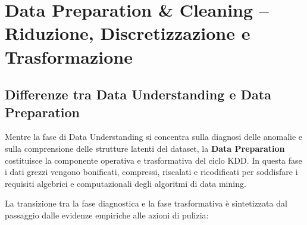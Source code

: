 \chapter{Data Preparation \& Cleaning -- Riduzione, Discretizzazione e Trasformazione}
\label{chap:dm-data-preparation-cleaning}

\FloatBarrier
\section{Differenze tra Data Understanding e Data Preparation}
\label{sec:dm-du-vs-dp}

Mentre la fase di Data Understanding si concentra sulla diagnosi delle anomalie e sulla comprensione delle strutture latenti del dataset, la \textbf{Data Preparation} costituisce la componente operativa e trasformativa del ciclo KDD. In questa fase i dati grezzi vengono bonificati, compressi, riscalati e ricodificati per soddisfare i requisiti algebrici e computazionali degli algoritmi di data mining.

La transizione tra la fase diagnostica e la fase trasformativa è sintetizzata dal passaggio dalle evidenze empiriche alle azioni di pulizia:

